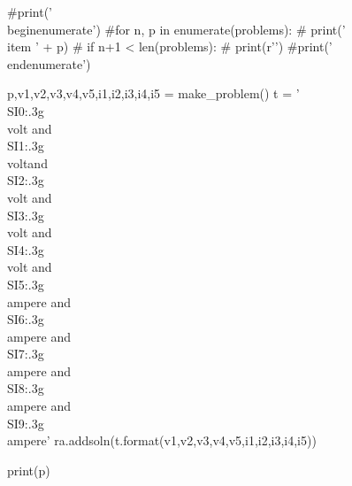 \documentclass[12pt]{exam}
\begin{document}
\begin{questions}
\begin{pycode}
#print('\\begin{enumerate}')
#for n, p in enumerate(problems):
#    print('\\item ' + p)
#    if n+1 < len(problems):
#        print(r'\vspace{1in}')
#print('\\end{enumerate}')

p,v1,v2,v3,v4,v5,i1,i2,i3,i4,i5 = make_problem()
t = '\\SI{{{0:.3g}}}{{\\volt}} and \\SI{{{1:.3g}}}{{\\volt}}and \\SI{{{2:.3g}}}{{\\volt}} and \\SI{{{3:.3g}}}{{\\volt}} and \\SI{{{4:.3g}}}{{\\volt}} and \\SI{{{5:.3g}}}{{\\ampere}} and \\SI{{{6:.3g}}}{{\\ampere}} and \\SI{{{7:.3g}}}{{\\ampere}} and \\SI{{{8:.3g}}}{{\\ampere}} and \\SI{{{9:.3g}}}{{\\ampere}}'
ra.addsoln(t.format(v1,v2,v3,v4,v5,i1,i2,i3,i4,i5))

print(p)

\end{pycode}

\end{questions}
	
\end{document}
